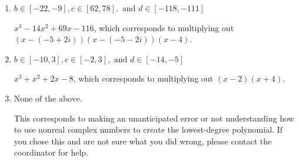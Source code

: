 \documentclass{extbook}[14pt]
\begin{document}
\begin{enumerate}
{\begin{enumerate}[label=\Alph*.]
* $x^{3} +14 x^{2} +69 x + 116$, which is the correct option.
\item \( b \in [-22, -9], c \in [62, 78], \text{ and } d \in [-118, -111] \)

$x^{3} -14 x^{2} +69 x -116$, which corresponds to multiplying out $(x-(-5 + 2 i))(x-(-5 - 2 i))(x -4)$.
\item \( b \in [-10, 3], c \in [-2, 3], \text{ and } d \in [-14, -5] \)

$x^{3} + x^{2} +2 x -8$, which corresponds to multiplying out $(x -2)(x + 4)$.
\item \( \text{None of the above.} \)

This corresponds to making an unanticipated error or not understanding how to use nonreal complex numbers to create the lowest-degree polynomial. If you chose this and are not sure what you did wrong, please contact the coordinator for help.
\end{enumerate}

}
\end{enumerate}
\end{document}
